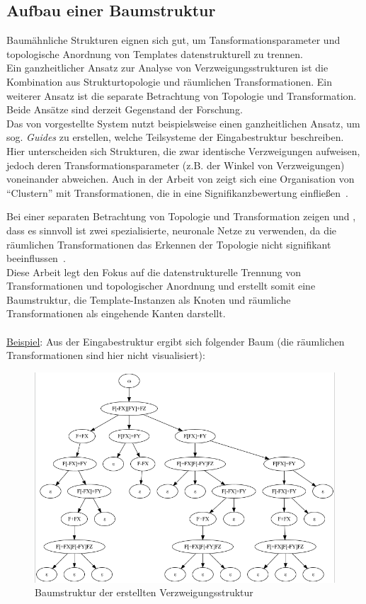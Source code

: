 \subsection*{Aufbau einer Baumstruktur}
Baumähnliche Strukturen eignen sich gut, um Tansformationsparameter und topologische Anordnung von Templates
datenstrukturell zu trennen.\\
Ein ganzheitlicher Ansatz zur Analyse von Verzweigungsstrukturen ist die Kombination aus Strukturtopologie und
räumlichen Transformationen.
Ein weiterer Ansatz ist die separate Betrachtung von Topologie und Transformation.
Beide Ansätze sind derzeit Gegenstand der Forschung.\\
Das von \citeauthor{benes_2011} vorgestellte System nutzt beispielsweise einen ganzheitlichen Ansatz, um sog.
\textit{Guides} zu erstellen, welche Teilsysteme der Eingabestruktur beschreiben.
Hier unterscheiden sich Strukturen, die zwar identische Verzweigungen aufweisen, jedoch deren
Transformationsparameter (z.B. der Winkel von Verzweigungen) voneinander abweichen.
Auch in der Arbeit von \citeauthor{stava_2010} zeigt sich eine Organisation von
"`Clustern"' mit Transformationen, die in eine Signifikanzbewertung einfließen~\cite{stava_2010}.

\newpage

Bei einer separaten Betrachtung von Topologie und Transformation zeigen \citeauthor{nishida_2016} und \citeauthor{guo_2020},
dass es sinnvoll ist zwei spezialisierte, neuronale Netze zu verwenden, da die räumlichen Transformationen das Erkennen
der Topologie nicht signifikant beeinflussen~\cite{nishida_2016, guo_2020}.\\
Diese Arbeit legt den Fokus auf die datenstrukturelle Trennung von Transformationen und topologischer
Anordnung und erstellt somit eine Baumstruktur, die Template-Instanzen als Knoten und
räumliche Transformationen als eingehende Kanten darstellt.\\~\\
\underline{Beispiel}: Aus der Eingabestruktur ergibt sich folgender Baum (die räumlichen Transformationen sind hier nicht visualisiert):
\begin{figure}[H]
    \centering
    \includegraphics[width=12cm]{../images/evaluierung_inferrieren_baum.png}
    \caption{Baumstruktur der erstellten Verzweigungsstruktur}
\end{figure}

